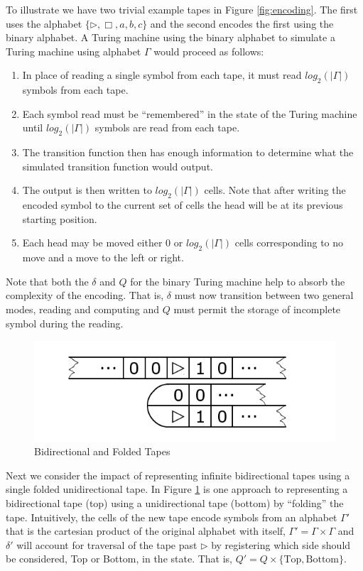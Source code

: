 \documentclass[usletter]{article}
\begin{document}
To illustrate we have two trivial example tapes in Figure \ref{fig:encoding}. The first uses the alphabet $\{\rhd, \Box, a, b, c\}$ and the second encodes the first using the binary alphabet. A Turing machine using the binary alphabet to simulate a Turing machine using alphabet $\Gamma$ would proceed as follows:

\begin{enumerate}
  \item In place of reading a single symbol from each tape, it must read $log_2(|\Gamma|)$ symbols from each tape.
  \item Each symbol read must be ``remembered'' in the state of the Turing machine until $log_2(|\Gamma|)$ symbols are read from each tape.
  \item The transition function then has enough information to determine what the simulated transition function would output.
  \item The output is then written to $log_2(|\Gamma|)$ cells. Note that after writing the encoded symbol to the current set of cells the head will be at its previous starting position.
  \item Each head may be moved either 0 or $log_2(|\Gamma|)$ cells corresponding to no move and a move to the left or right.
\end{enumerate}

Note that both the $\delta$ and $Q$ for the binary Turing machine help to absorb the complexity of the encoding. That is, $\delta$ must now transition between two general modes, reading and computing and $Q$ must permit the storage of incomplete symbol during the reading.

\begin{figure}
\begin{center}
\includegraphics[width=1\textwidth]{lectures/graphics/folded}
\end{center}
\caption{Bidirectional and Folded Tapes}
\label{fig:folded}
\end{figure}


Next we consider the impact of representing infinite bidirectional tapes using a single folded unidirectional tape. In Figure \ref{fig:folded} is one approach to representing a bidirectional tape (top) using a unidirectional tape (bottom) by ``folding'' the tape. Intuitively, the cells of the new tape encode symbols from an alphabet $\Gamma'$ that is the cartesian product of the original alphabet with itself, $\Gamma' = \Gamma \times \Gamma$ and $\delta'$ will account for traversal of the tape past $\rhd$ by registering which side should be considered, Top or Bottom, in the state. That is, $Q' = Q \times \{\text{Top}, \text{Bottom}\}$.
\end{document}
